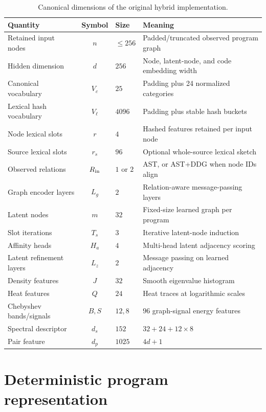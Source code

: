 \documentclass[11pt,a4paper]{article}
\begin{document}
\begin{table}[H]
\centering
\small
\begin{tabularx}{\linewidth}{@{}lclX@{}}
\toprule
Quantity & Symbol & Size & Meaning \\
\midrule
Retained input nodes & $n$ & $\leq256$ & Padded/truncated observed program graph \\
Hidden dimension & $d$ & $256$ & Node, latent-node, and code embedding width \\
Canonical vocabulary & $V_c$ & $25$ & Padding plus 24 normalized categories \\
Lexical hash vocabulary & $V_\ell$ & $4096$ & Padding plus stable hash buckets \\
Node lexical slots & $r$ & $4$ & Hashed features retained per input node \\
Source lexical slots & $r_s$ & $96$ & Optional whole-source lexical sketch \\
Observed relations & $R_{\rm in}$ & $1$ or $2$ & AST, or AST+DDG when node IDs align \\
Graph encoder layers & $L_g$ & $2$ & Relation-aware message-passing layers \\
Latent nodes & $m$ & $32$ & Fixed-size learned graph per program \\
Slot iterations & $T_s$ & $3$ & Iterative latent-node induction \\
Affinity heads & $H_a$ & $4$ & Multi-head latent adjacency scoring \\
Latent refinement layers & $L_z$ & $2$ & Message passing on learned adjacency \\
Density features & $J$ & $32$ & Smooth eigenvalue histogram \\
Heat features & $Q$ & $24$ & Heat traces at logarithmic scales \\
Chebyshev bands/signals & $B,S$ & $12,8$ & $96$ graph-signal energy features \\
Spectral descriptor & $d_s$ & $152$ & $32+24+12\times8$ \\
Pair feature & $d_p$ & $1025$ & $4d+1$ \\
\bottomrule
\end{tabularx}
\caption{Canonical dimensions of the original hybrid implementation.}
\end{table}

\section{Deterministic program representation}
\end{document}
